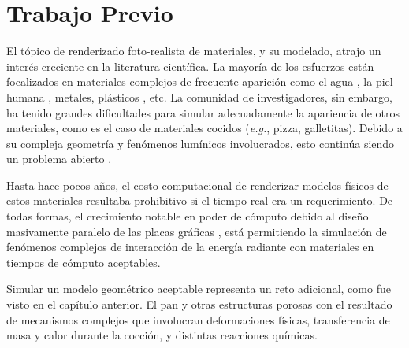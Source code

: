 




\section{Trabajo Previo}
El tópico de renderizado foto-realista de materiales, y su modelado, atrajo un interés creciente en la literatura científica.
La mayoría de los esfuerzos están focalizados en materiales complejos de frecuente aparición como el agua \cite{Schechter2012}, la piel humana \cite{Donner2006}, metales, plásticos \cite{Kurt2010}, etc.
La comunidad de investigadores, sin embargo, ha tenido grandes dificultades para simular adecuadamente la apariencia de otros materiales, como es el caso de materiales cocidos ({\em e.g.}, pizza, galletitas).
Debido a su compleja geometría y fenómenos lumínicos involucrados, esto continúa siendo un problema abierto \cite{Voglsam2013}.

Hasta hace pocos años, el costo computacional de renderizar modelos físicos de estos materiales resultaba prohibitivo si el tiempo real era un requerimiento.
De todas formas, el crecimiento notable en poder de cómputo debido al diseño masivamente paralelo de las placas gráficas \cite{Yeo09,Harris06}, está permitiendo la simulación de fenómenos complejos de interacción de la energía radiante con materiales en tiempos de cómputo aceptables.

Simular un modelo geométrico aceptable representa un reto adicional, como fue visto en el capítulo anterior.
El pan y otras estructuras porosas con el resultado de mecanismos complejos que involucran deformaciones físicas, transferencia de masa y calor durante la cocción, y distintas reacciones químicas.

